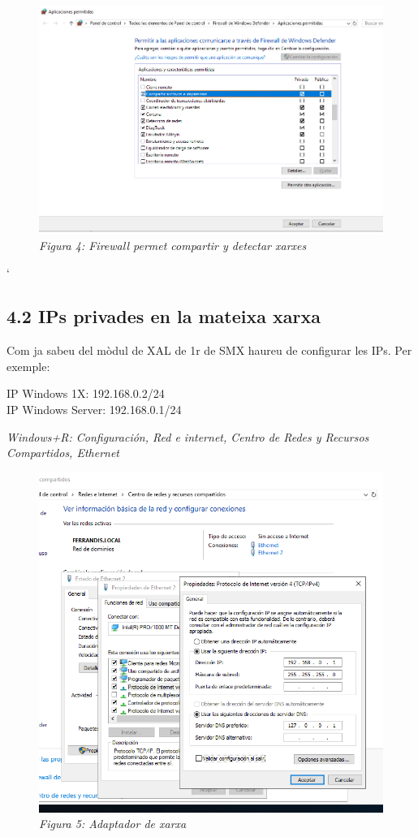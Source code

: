\documentclass[
  a4paper,
]{article}
\begin{document}
\begin{figure}
\centering
\includegraphics{png/ADDS/FirewallCompartiryDetectar.png}
\caption{\emph{Figura 4: Firewall permet compartir y detectar xarxes}}
\end{figure}

`

\subsection{4.2 IPs privades en la mateixa
xarxa}\label{ips-privades-en-la-mateixa-xarxa}

Com ja sabeu del mòdul de XAL de 1r de SMX haureu de configurar les IPs.
Per exemple:

IP Windows 1X: 192.168.0.2/24\\
IP Windows Server: 192.168.0.1/24

\emph{Windows+R: Configuración, Red e internet, Centro de Redes y
Recursos Compartidos, Ethernet}

\begin{figure}
\centering
\includegraphics{png/ADDS/tarja2.png}
\caption{\emph{Figura 5: Adaptador de xarxa}}
\end{figure}
\end{document}
